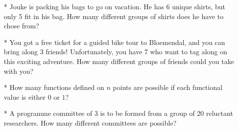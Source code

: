 \documentclass{article}
\begin{document}
\begin{enumerate}
	\item[*] Jouke is packing his bags to go on vacation. He has 6 unique shirts, but only 5 fit in his bag. How many different groups of shirts does he have to chose from?
	\item[*] You got a free ticket for a guided bike tour to Bloemendal, and you can bring along 3 friends! Unfortunately, you have 7 who want to tag along on this exciting adventure. How many different groups of friends could you take with you?
	\item[*] How many functions defined on $n$ points are possible if each functional value is either $0$ or $1$?
	\item[*] A programme committee of $3$ is to be formed from a group of 20 reluctant researchers. How many different committees are possible?
\end{enumerate}
\end{document}
